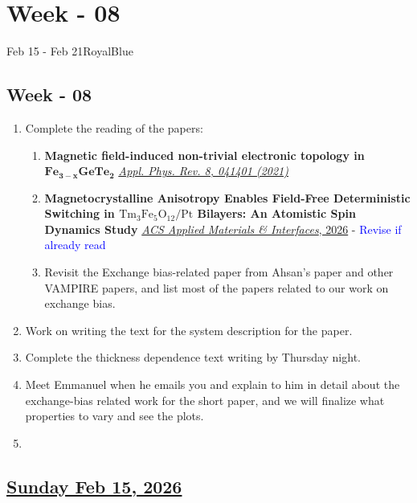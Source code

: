 \section{Week - 08}
\begin{physicsmodule}{Feb 15 - Feb 21}{RoyalBlue}
  \begin{lawbox}
    \subsection*{\sffamily\bfseries Week - 08}
    \begin{enumerate}
    \item Complete the reading of the papers:
    \begin{enumerate} [\ding{212}]
        \item \textbf{Magnetic field-induced non-trivial electronic topology in} $\mathbf{Fe_{3-x}Ge Te_2}$ \href{https://doi.org/10.1063/5.0052952}{\textit{Appl. Phys. Rev. 8, 041401 (2021)}}
        \item \textbf{Magnetocrystalline Anisotropy Enables Field-Free Deterministic Switching in $\mathrm{Tm_3Fe_5O_{12}/Pt}$ Bilayers: An Atomistic Spin Dynamics Study} \href{https://doi.org/10.1021/acsami.5c23180}{\textit{ACS Applied Materials \& Interfaces}, 2026} - \textcolor{blue}{Revise if already read}
        \item Revisit the Exchange bias-related paper from Ahsan's paper and other VAMPIRE papers, and list most of the papers related to our work on exchange bias.
    \end{enumerate}
    \item Work on writing the text for the system description for the paper.
    \item Complete the thickness dependence text writing by Thursday night.
    \item Meet Emmanuel when he emails you and explain to him in detail about the exchange-bias related work for the short paper, and we will finalize what properties to vary and see the plots.
    \item 
\end{enumerate}
  \end{lawbox}
\end{physicsmodule}
\subsection*{\underline{Sunday Feb 15, 2026}}
